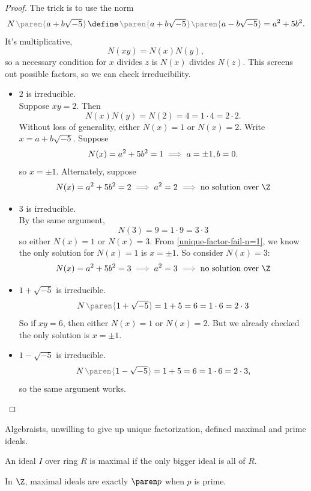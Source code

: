 \documentclass[a5paper]{scrartcl}
\newcommand{\gray}[1]{{\color{gray}#1}}
\newcommand{\black}[1]{{\color{black}#1}}
\newcommand{\gparen}[1]{\left .\!{\gray{\paren{\black{#1}}}}\!\right.}
\let\oldimplies\implies
\def\implies{\color{gray}\oldimplies\color{black}}
\begin{document}
\begin{proof}
  The trick is to use the norm
  \[
    N\gparen{a+b\sqrt{-5}} \define \gparen{a+b\sqrt{-5}}\gparen{a-b\sqrt{-5}} = a^2 + 5 b^2.
  \]
  It's multiplicative,
  \[
    N(xy) = N(x)N(y),
  \]
  so a necessary condition for \(x\) divides \(z\) is \(N(x)\) divides \(N(z)\). This screens out possible factors, so we can check irreducibility.
  \begin{itemize}
    \item \(2\) is irreducible.\\ Suppose \(xy=2\). Then
          \[
          N(x)N(y) = N(2)= 4 = 1\cdot 4 = 2\cdot 2.
          \]
          Without loss of generality, either \(N(x)=1\) or \(N(x)=2\). Write \(x = a + b\sqrt{-5}\). Suppose
          \begin{equation}
            \label{unique-factor-fail-n=1}
            N(x)= a^2+ 5b^2 = 1 \implies a = \pm 1, b=0.
          \end{equation}
          so \(x=\pm 1\). Alternately, suppose
          \[
          N(x)=a^2+5b^2=2 \implies a^2= 2\implies \text{no solution over \(\Z\)}
          \]
    \item  \(3\) is irreducible.\\ By the same argument,
          \[
          N(3) = 9 = 1 \cdot 9 = 3 \cdot 3
          \]
          so either \(N(x)=1\) or \(N(x)=3\). From \cref{unique-factor-fail-n=1}, we know the only solution for \(N(x)=1\) is \(x=\pm1\). So consider \(N(x)=3\):
          \[
          N(x)=a^2+5b^2 = 3 \implies{a^2=3} \implies \text{no solution over \(\Z\)}
          \]
    \item \(1+\sqrt{-5}\) is irreducible.
          \[
          N\gparen{1+\sqrt{-5}} = 1+5 = 6= 1\cdot 6 = 2\cdot 3
          \]
          So if \(xy=6\), then either \(N(x)=1\) or \(N(x)=2\). But we already checked the only solution is \(x=\pm 1\).
    \item \(1-\sqrt{-5}\) is irreducible.
          \[
          N\gparen{1-\sqrt{-5}} = 1 + 5  = 6 = 1\cdot 6 =2 \cdot 3,
          \]
          so the same argument works.
  \end{itemize}
\end{proof}
Algebraists, unwilling to give up unique factorization, defined maximal and prime ideals.
\begin{defn}
  An ideal \(I\) over ring \(R\) is maximal if the only bigger ideal is all of \(R\).
\end{defn}
In \(\Z\), maximal ideals are exactly \(\paren p\) when \(p\) is prime.
\end{document}
